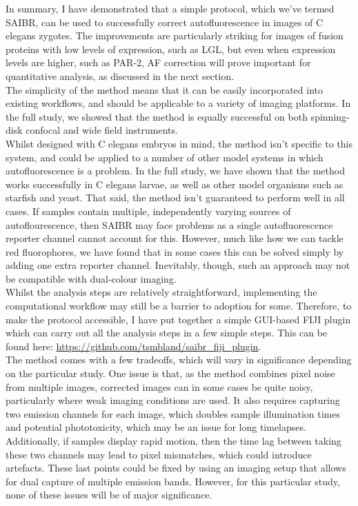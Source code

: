 \documentclass[12pt]{"article"}
\begin{document}
In summary, I have demonstrated that a simple protocol, which we’ve termed SAIBR, can be used to successfully correct autofluorescence in images of C elegans zygotes. The improvements are particularly striking for images of fusion proteins with low levels of expression, such as LGL, but even when expression levels are higher, such as PAR-2, AF correction will prove important for quantitative analysis, as discussed in the next section. \\

The simplicity of the method means that it can be easily incorporated into existing workflows, and should be applicable to a variety of imaging platforms. In the full study, we showed that the method is equally successful on both spinning-disk confocal and wide field instruments. \\

Whilst designed with C elegans embryos in mind, the method isn't specific to this system, and could be applied to a number of other model systems in which autofluorescence is a problem. In the full study, we have shown that the method works successfully in C elegans larvae, as well as other model organisms such as starfish and yeast. That said, the method isn’t guaranteed to perform well in all cases. If samples contain multiple, independently varying sources of autoflourescence, then SAIBR may face problems as a single autofluorescence reporter channel cannot account for this. However, much like how we can tackle red fluorophores, we have found that in some cases this can be solved simply by adding one extra reporter channel. Inevitably, though, such an approach may not be compatible with dual-colour imaging. \\

Whilst the analysis steps are relatively straightforward, implementing the computational workflow may still be a barrier to adoption for some. Therefore, to make the protocol accessible, I have put together a simple GUI-based FIJI plugin which can carry out all the analysis steps in a few simple steps. This can be found here: \url{https://github.com/tsmbland/saibr_fiji_plugin}. \\

The method comes with a few tradeoffs, which will vary in significance depending on the particular study. One issue is that, as the method combines pixel noise from multiple images, corrected images can in some cases be quite noisy, particularly where weak imaging conditions are used. It also requires capturing two emission channels for each image, which doubles sample illumination times and potential phototoxicity, which may be an issue for long timelapses. Additionally, if samples display rapid motion, then the time lag between taking these two channels may lead to pixel mismatches, which could introduce artefacts. These last points could be fixed by using an imaging setup that allows for dual capture of multiple emission bands. However, for this particular study, none of these issues will be of major significance. \\
\end{document}
